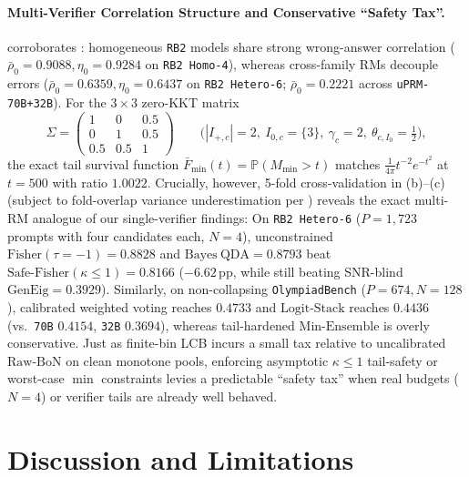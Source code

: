 \documentclass[10pt]{article}
\theoremstyle{plain}
\theoremstyle{definition}
\theoremstyle{remark}
\newcommand{\Prob}{\mathbb{P}}
\begin{document}
\paragraph{Multi-Verifier Correlation Structure and Conservative ``Safety Tax''.}
 corroborates : homogeneous \texttt{RB2} models share strong wrong-answer correlation ($\bar{\rho}_0 = 0.9088, \eta_0 = 0.9284$ on \texttt{RB2 Homo-4}), whereas cross-family RMs decouple errors ($\bar{\rho}_0 = 0.6359, \eta_0 = 0.6437$ on \texttt{RB2 Hetero-6}; $\bar{\rho}_0 = 0.2221$ across \texttt{uPRM-70B+32B}). For the $3\times 3$ zero-KKT matrix
\[
\Sigma = \begin{pmatrix}1 & 0 & 0.5\\ 0 & 1 & 0.5\\ 0.5 & 0.5 & 1\end{pmatrix} \qquad \Big(|I_{+,c}|=2,\ I_{0,c}=\{3\},\ \gamma_c=2,\ \theta_{c, I_0}=\tfrac{1}{2}\Big),
\]
the exact tail survival function $\bar{F}_{\min}(t) = \Prob(M_{\min} > t)$ matches $\frac{1}{4\pi}t^{-2}e^{-t^2}$ at $t=500$ with ratio $1.0022$. Crucially, however, 5-fold cross-validation in (b)--(c) (subject to fold-overlap variance underestimation per \citet{nadeau2003inference}) reveals the exact multi-RM analogue of our single-verifier findings:
On \texttt{RB2 Hetero-6} ($P=1{,}723$ prompts with four candidates each, $N=4$), unconstrained $\mathrm{Fisher}(\tau=-1)=0.8828$ and $\mathrm{Bayes\ QDA}=0.8793$ beat $\mathrm{Safe\text{-}Fisher}(\kappa\le 1)=0.8166$ ($-6.62\,\mathrm{pp}$, while still beating SNR-blind $\mathrm{GenEig}=0.3929$). Similarly, on non-collapsing \texttt{OlympiadBench} ($P=674, N=128$), calibrated weighted voting reaches $0.4733$ and $\mathrm{Logit\text{-}Stack}$ reaches $0.4436$ (vs.\ \texttt{70B} $0.4154$, \texttt{32B} $0.3694$), whereas tail-hardened $\mathrm{Min\text{-}Ensemble}$ is overly conservative. Just as finite-bin LCB incurs a small tax relative to uncalibrated $\mathrm{Raw\text{-}BoN}$ on clean monotone pools, enforcing asymptotic $\kappa \le 1$ tail-safety or worst-case $\min$ constraints levies a predictable ``safety tax'' when real budgets ($N=4$) or verifier tails are already well behaved.

\section{Discussion and Limitations}
\label{sec:discussion}
\end{document}
